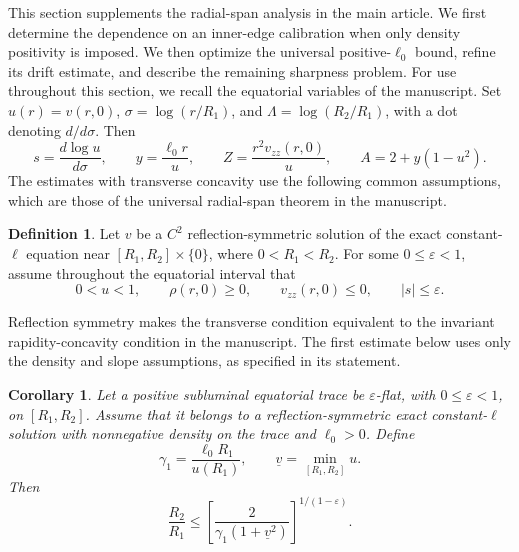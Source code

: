 \documentclass[11pt,a4paper]{article}
\numberwithin{equation}{section}
\theoremstyle{plain}
\newtheorem{corollary}{Corollary}
\theoremstyle{definition}
\newtheorem{definition}{Definition}
\theoremstyle{remark}
\newcommand{\ellzero}{\ell_0}
\begin{document}
This section supplements the radial-span analysis in the main article. We first determine the dependence on an inner-edge calibration when only density positivity is imposed. We then optimize the universal positive-$\ellzero$ bound, refine its drift estimate, and describe the remaining sharpness problem. For use throughout this section, we recall the equatorial variables of the manuscript. Set $u(r)=v(r,0)$, $\sigma=\log(r/R_1)$, and $\Lambda=\log(R_2/R_1)$, with a dot denoting $d/d\sigma$. Then
\begin{equation}\label{eq:supp-equatorial-variables}
s=\frac{d\log u}{d\sigma},\qquad
y=\frac{\ellzero r}{u},\qquad
Z=\frac{r^2v_{zz}(r,0)}{u},\qquad
A=2+y(1-u^2).
\end{equation}
The estimates with transverse concavity use the following common assumptions, which are those of the universal radial-span theorem in the manuscript.
\begin{definition}\label{def:supp-span-hypotheses}
Let $v$ be a $C^2$ reflection-symmetric solution of the exact constant-$\ell$ equation near $[R_1,R_2]\times\{0\}$, where $0<R_1<R_2$. For some $0\leqslant\varepsilon<1$, assume throughout the equatorial interval that
\begin{equation}\label{eq:supp-span-hypotheses}
0<u<1,\qquad \rho(r,0)\geqslant0,\qquad
v_{zz}(r,0)\leqslant0,\qquad |s|\leqslant\varepsilon.
\end{equation}
\end{definition}
Reflection symmetry makes the transverse condition equivalent to the invariant rapidity-concavity condition in the manuscript. The first estimate below uses only the density and slope assumptions, as specified in its statement.
\begin{corollary}\label{cor:density-only-approx-flat-bound}
Let a positive subluminal equatorial trace be $\varepsilon$-flat, with $0\leqslant\varepsilon<1$, on $[R_1,R_2]$. Assume that it belongs to a reflection-symmetric exact constant-$\ell$ solution with nonnegative density on the trace and $\ellzero>0$. Define
\begin{equation}\label{eq:gamma-inner-rotation-strength}
\gamma_1=\frac{\ellzero R_1}{u(R_1)},\qquad
\underline v=\min_{[R_1,R_2]}u.
\end{equation}
Then
\begin{equation}\label{eq:density-only-span-bound}
\frac{R_2}{R_1}\leqslant
\left[\frac{2}{\gamma_1(1+\underline v^2)}\right]^{1/(1-\varepsilon)}.
\end{equation}
\end{corollary}
\end{document}
